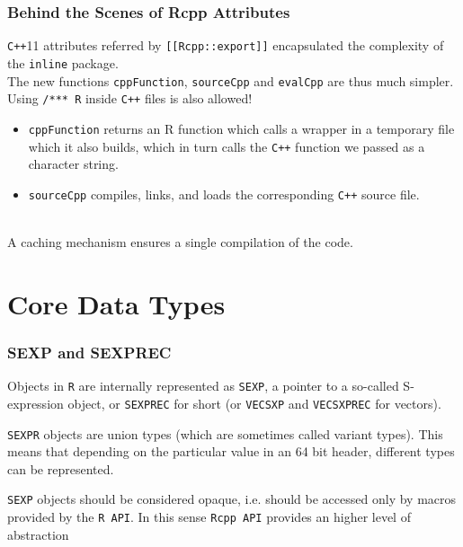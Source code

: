 \documentclass{beamer}
\def\code#1{\texttt{#1}} %
\begin{document}

\begin{frame}
\frametitle{Behind the Scenes of Rcpp Attributes}
\code{C++}11 attributes referred by \code{[[Rcpp::export]]} encapsulated the complexity of the \code{inline} package.\pause
\\
\vspace{3mm}
The new functions \code{cppFunction}, \code{sourceCpp} and \code{evalCpp} are thus much simpler. Using \code{/*** R} inside \code{C++} files is also allowed!\pause
\begin{itemize}
    \item \code{cppFunction} returns an R function which calls a wrapper in a temporary file which it also builds, which in turn  calls  the \code{C++} function we  passed  as  a  character string. \pause
    \item \code{sourceCpp} compiles, links, and loads the corresponding \code{C++} source file. \pause
\end{itemize}
\\
\vspace{3mm}
A caching mechanism ensures a single compilation of the code.
\end{frame}


\section{Core Data Types}



\begin{frame}
	\frametitle{SEXP and SEXPREC}
	
Objects in \code{R} are internally represented as \code{SEXP}, a pointer to a so-called S-expression object, or \code{SEXPREC} for short (or \code{VECSXP} and \code{VECSXPREC} for vectors). \pause

\bigskip

\code{SEXPR} objects are \alert{union types} (which are sometimes called variant types). This means that depending on the particular value in an 64 bit header, different types can be represented. \pause

\bigskip

\code{SEXP} objects should be considered opaque, i.e. should be accessed only by macros provided by the \code{R API}. In this sense \code{Rcpp API} provides an higher level of abstraction 

	
	
\end{frame}	
\end{document}
